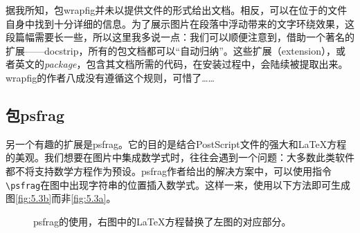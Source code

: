 据我所知，包\textsf{wrapfig}并未以提供文件的形式给出文档。相反，可以在位于的文件自身中找到十分详细的信息。为了展示图片在段落中浮动带来的文字环绕效果，这段篇幅需要长一些，所以这里我多说一点：我们可以顺便注意到，借助一个著名的扩展——\textsf{docstrip}，所有的包文档都可以``自动归纳''。这些扩展（extension），或者英文的\emph{package}，包含其文档所需的代码，在安装过程中，会陆续被提取出来。\textsf{wrapfig}的作者八成没有遵循这个规则，可惜了……

\subsection{包\textsf{psfrag}}

另一个有趣的扩展是\textsf{psfrag}。它的目的是结合PostScript文件的强大和\LaTeX 方程的美观。我们想要在图片中集成数学式时，往往会遇到一个问题：大多数此类软件都不将支持数学方程作为预设。\textsf{psfrag}作者给出的解决方案中，可以使用指令\verb|\psfrag|在图中出现字符串的位置插入数学式。这样一来，使用以下方法即可生成图\ref{fig:5.3b}而非\ref{fig:5.3a}。
% 
% 

\begin{figure}[ht]
  \begin{center}
      \leavevmode {}
      \hspace{2cm} 
    \caption{\textsf{psfrag}的使用，右图中的\LaTeX 方程替换了左图的对应部分。}%
    \label{fig:5.3}
  \end{center}
\end{figure}


